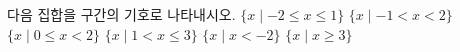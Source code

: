 다음 집합을 구간의 기호로 나타내시오.
 $\{x \mid -2\le x\le 1\}$
 $\{x \mid -1<x<2\}$
 $\{x \mid 0\le x<2\}$
 $\{x \mid 1<x\le 3\}$
 $\{x \mid x<-2\}$
 $\{x \mid x\ge 3\}$
